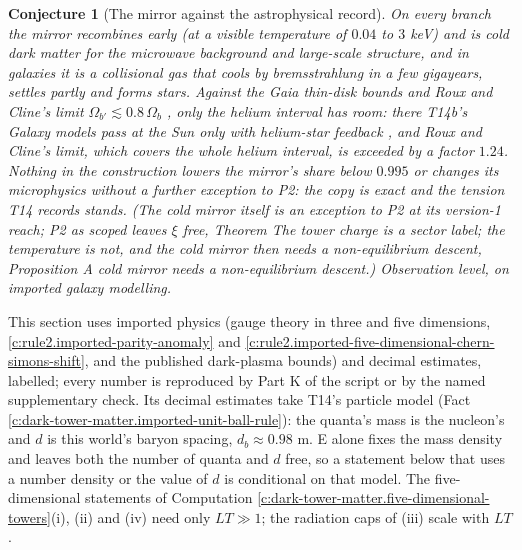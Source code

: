 \documentclass[11pt]{article}
\newtheorem{conjecture}[theorem]{Conjecture}
\theoremstyle{definition}
\theoremstyle{plain}
\newcommand{\changedmark}[2]{\marginpar{\raggedright\scriptsize\color{#1}#2}}
\begin{document}
\begin{conjecture}[The mirror against the astrophysical record]\label{c:dark-tower-matter.mirror-against-record}
\changedmark{BurntOrange}{changed since the deposit}
On every branch the mirror recombines early (at a visible temperature of $0.04$ to $3$ keV) and is cold dark matter for the microwave background and large-scale structure, and in galaxies it is a collisional gas that cools by bremsstrahlung in a few gigayears, settles partly and forms stars. Against the Gaia thin-disk bounds \cite{Widmark2021} and Roux and Cline's limit $\Omega_{b'} \lesssim 0.8\,\Omega_{b}$ \cite{RouxCline2020}, only the helium interval has room: there T14b's Galaxy models pass at the Sun only with helium-star feedback \cite[Obs.~9.1]{ButlerT14b}, and Roux and Cline's limit, which covers the whole helium interval, is exceeded by a factor $1.24$. Nothing in the construction lowers the mirror's share below $0.995$ or changes its microphysics without a further exception to P2: the copy is exact and the tension T14 records stands. (The cold mirror itself is an exception to P2 at its version-1 reach; P2 as scoped leaves $\xi$ free, Theorem \emph{The tower charge is a sector label; the temperature is not}, and the cold mirror then needs a non-equilibrium descent, Proposition \emph{A cold mirror needs a non-equilibrium descent}.) Observation level, on imported galaxy modelling.
\end{conjecture}

\label{c:note.dark-tower-matter.setting-content-matter}
This section uses imported physics (gauge theory in three and five dimensions, \ref{c:rule2.imported-parity-anomaly} and \ref{c:rule2.imported-five-dimensional-chern-simons-shift}, and the published dark-plasma bounds) and decimal estimates, labelled; every number is reproduced by Part K of the script or by the named supplementary check. Its decimal estimates take T14's particle model (Fact \ref{c:dark-tower-matter.imported-unit-ball-rule}): the quanta's mass is the nucleon's and $d$ is this world's baryon spacing, $d_{b} \approx 0.98$ m. E alone fixes the mass density and leaves both the number of quanta and $d$ free, so a statement below that uses a number density or the value of $d$ is conditional on that model. The five-dimensional statements of Computation \ref{c:dark-tower-matter.five-dimensional-towers}(i), (ii) and (iv) need only $LT \gg 1$; the radiation caps of (iii) scale with $LT$.
\end{document}
